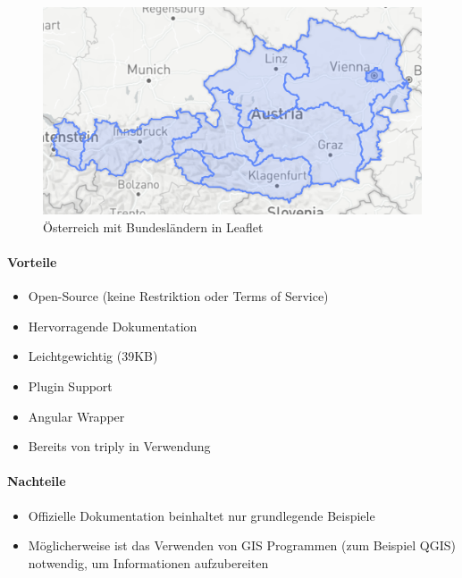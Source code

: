 \begin{figure}[hbt!]
    \centering
    \includegraphics[scale=0.4]{pics/austria-leaflet}
    \caption{Österreich mit Bundesländern in Leaflet}
    \label{fig:austria-leaflet}
\end{figure}

\paragraph{Vorteile}
\begin{itemize}
    \item Open-Source (keine Restriktion oder Terms of Service)
    \item Hervorragende Dokumentation
    \item Leichtgewichtig (39KB)
    \item Plugin Support
    \item Angular Wrapper
    \item Bereits von triply in Verwendung
\end{itemize}

\paragraph{Nachteile}
\begin{itemize}
    \item Offizielle Dokumentation beinhaltet nur grundlegende Beispiele
    \item Möglicherweise ist das Verwenden von GIS Programmen (zum Beispiel QGIS) notwendig, um Informationen aufzubereiten
\end{itemize}

